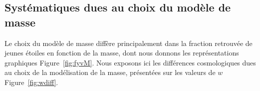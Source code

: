 \documentclass[../main/main.tex]{subfiles}
\begin{document}

\subsection{Systématiques dues au choix du modèle de masse}\label{ssec:modsys}

Le choix du modèle de masse diffère principalement dans la fraction retrouvée de
jeunes étoiles en fonction de la masse, dont nous donnons les représentations
graphiques Figure~\ref{fig:fyvM}. Nous exposons ici les différences
cosmologiques dues au choix de la modélisation de la masse, présentées sur les
valeurs de $w$ Figure~\ref{fig:wdiff}.
\end{document}
